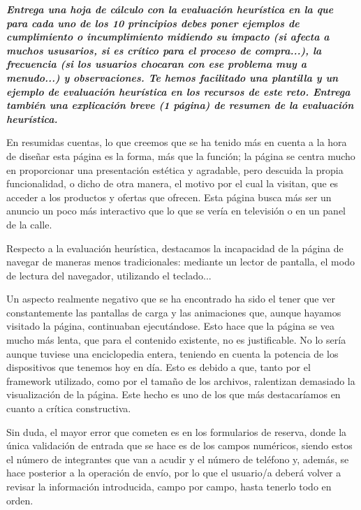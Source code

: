 \documentclass[spanish]{article}
\begin{document}
\textbf{\textit{Entrega una hoja de cálculo con la evaluación heurística en la que para
cada uno de los 10 principios debes poner ejemplos de cumplimiento o
incumplimiento midiendo su impacto (si afecta a muchos ususarios, si es crítico
para el proceso de compra...), la frecuencia (si los usuarios chocaran con ese
problema muy a menudo...) y observaciones. Te hemos facilitado una plantilla y
un ejemplo de evaluación heurística en los recursos de este reto. Entrega
también una explicación breve (1 página) de resumen de la evaluación
heurística.}}
\newline

En resumidas cuentas, lo que creemos que se ha tenido más en cuenta a la hora
de diseñar esta página es la forma, más que la función; la página se centra
mucho en proporcionar una presentación estética y agradable, pero descuida la
propia funcionalidad, o dicho de otra manera, el motivo por el cual la visitan,
que es acceder a los productos y ofertas que ofrecen. Esta página busca más
ser un anuncio un poco más interactivo que lo que se vería en televisión o en
un panel de la calle.\newline

Respecto a la evaluación heurística, destacamos la incapacidad de la página de
navegar de maneras menos tradicionales: mediante un lector de pantalla, el modo
de lectura del navegador, utilizando el teclado...\newline

Un aspecto realmente negativo que se ha encontrado ha sido el tener que ver
constantemente las pantallas de carga y las animaciones que, aunque hayamos
visitado la página, continuaban ejecutándose. Esto hace que la página se vea
mucho más lenta, que para el contenido existente, no es justificable. No lo
sería aunque tuviese una enciclopedia entera, teniendo en cuenta la potencia de
los dispositivos que tenemos hoy en día. Esto es debido a que, tanto por el
framework utilizado, como por el tamaño de los archivos, ralentizan demasiado la
visualización de la página. Este hecho es uno de los que más destacaríamos en
cuanto a crítica constructiva.\newline

\newpage

Sin duda, el mayor error que cometen es en los formularios de reserva, donde la
única validación de entrada que se hace es de los campos numéricos, siendo estos
el número de integrantes que van a acudir y el número de teléfono y, además, se
hace posterior a la operación de envío, por lo que el usuario/a deberá volver a
revisar la información introducida, campo por campo, hasta tenerlo todo en
orden.\newline
\end{document}
